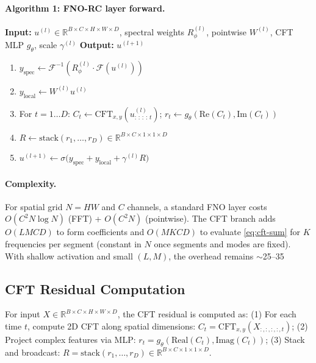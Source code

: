 \documentclass[11pt]{article}
\newcommand{\R}{\mathbb{R}}
\newcommand{\F}{\mathcal{F}}
\begin{document}
\paragraph{Algorithm 1: FNO-RC layer forward.}
\begin{center}
\begin{minipage}{0.92\linewidth}
\begin{flushleft}
\textbf{Input:} $u^{(l)}\in\R^{B\times C\times H\times W\times D}$, spectral weights $R_\phi^{(l)}$, pointwise $W^{(l)}$, CFT MLP $g_\theta$, scale $\gamma^{(l)}$\newline
\textbf{Output:} $u^{(l+1)}$
\end{flushleft}
\vspace{-0.5em}
\begin{enumerate}\setlength{\itemsep}{1pt}
  \item $y_{\mathrm{spec}} \leftarrow \F^{-1}( R_\phi^{(l)} \cdot \F(u^{(l)}) )$
  \item $y_{\mathrm{local}} \leftarrow W^{(l)} u^{(l)}$
  \item For $t=1\ldots D$: $C_t \leftarrow \mathrm{CFT}_{x,y}(u^{(l)}_{:\,:\,:\,:\,t})$; $r_t \leftarrow g_\theta(\mathrm{Re}(C_t),\mathrm{Im}(C_t))$
  \item $R \leftarrow \mathrm{stack}(r_1,\ldots,r_D) \in \R^{B\times C\times 1\times 1\times D}$
  \item $u^{(l+1)} \leftarrow \sigma\big(y_{\mathrm{spec}} + y_{\mathrm{local}} + \gamma^{(l)} R\big)$
\end{enumerate}
\end{minipage}
\end{center}

\paragraph{Complexity.} For spatial grid $N=HW$ and $C$ channels, a standard FNO layer costs $O(C^2 N\log N)$ (FFT) + $O(C^2 N)$ (pointwise). The CFT branch adds $O(LM C D)$ to form coefficients and $O(MK C D)$ to evaluate \eqref{eq:cft-sum} for $K$ frequencies per segment (constant in $N$ once segments and modes are fixed). With shallow activation and small $(L,M)$, the overhead remains $\sim$25–35%

\subsection{CFT Residual Computation}

For input $X \in \R^{B \times C \times H \times W \times D}$, the CFT residual is computed as: (1) For each time $t$, compute 2D CFT along spatial dimensions: $C_t = \text{CFT}_{x,y}(X_{:,:,:,:,t})$; (2) Project complex features via MLP: $r_t = g_\theta(\text{Real}(C_t), \text{Imag}(C_t))$; (3) Stack and broadcast: $R = \text{stack}(r_1, \ldots, r_D) \in \R^{B \times C \times 1 \times 1 \times D}$.
\end{document}
